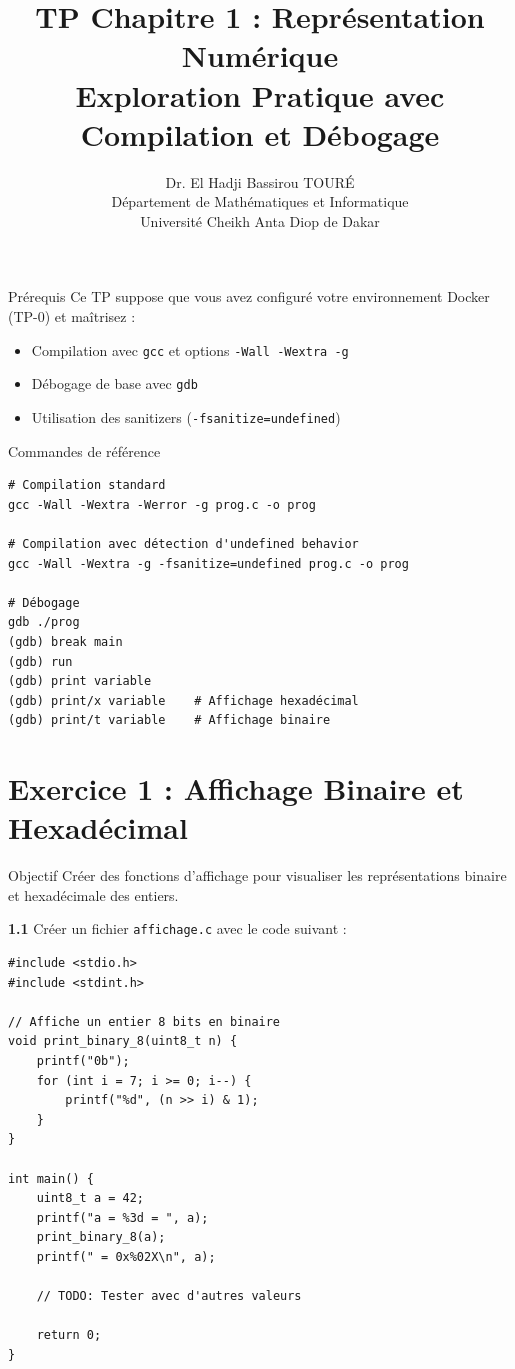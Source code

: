\documentclass[10pt,a4paper]{article}
\title{\textbf{TP Chapitre 1 : Représentation Numérique}\\
\large Exploration Pratique avec Compilation et Débogage}
\author{Dr. El Hadji Bassirou TOURÉ\\
Département de Mathématiques et Informatique\\
Université Cheikh Anta Diop de Dakar}
\date{}
\begin{document}
\maketitle

\begin{infobox}{Prérequis}
Ce TP suppose que vous avez configuré votre environnement Docker (TP-0) et maîtrisez :
\begin{itemize}
    \item Compilation avec \texttt{gcc} et options \texttt{-Wall -Wextra -g}
    \item Débogage de base avec \texttt{gdb}
    \item Utilisation des sanitizers (\texttt{-fsanitize=undefined})
\end{itemize}
\end{infobox}

\begin{infobox}{Commandes de référence}
\begin{verbatim}
# Compilation standard
gcc -Wall -Wextra -Werror -g prog.c -o prog

# Compilation avec détection d'undefined behavior
gcc -Wall -Wextra -g -fsanitize=undefined prog.c -o prog

# Débogage
gdb ./prog
(gdb) break main
(gdb) run
(gdb) print variable
(gdb) print/x variable    # Affichage hexadécimal
(gdb) print/t variable    # Affichage binaire
\end{verbatim}
\end{infobox}

\section{Exercice 1 : Affichage Binaire et Hexadécimal}

\begin{exercicebox}{Objectif}
Créer des fonctions d'affichage pour visualiser les représentations binaire et hexadécimale des entiers.
\end{exercicebox}

\textbf{1.1} Créer un fichier \texttt{affichage.c} avec le code suivant :

\begin{lstlisting}
#include <stdio.h>
#include <stdint.h>

// Affiche un entier 8 bits en binaire
void print_binary_8(uint8_t n) {
    printf("0b");
    for (int i = 7; i >= 0; i--) {
        printf("%d", (n >> i) & 1);
    }
}

int main() {
    uint8_t a = 42;
    printf("a = %3d = ", a);
    print_binary_8(a);
    printf(" = 0x%02X\n", a);
    
    // TODO: Tester avec d'autres valeurs
    
    return 0;
}
\end{lstlisting}
\end{document}
